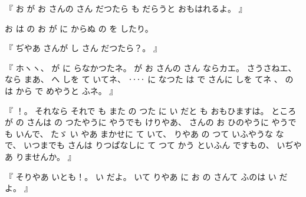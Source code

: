 %
『
お
が
お
さんの
さん
だつたら
も
だらうと
おもはれるよ。
』

%
お
は
の
お
が
に
からぬ
の
を
したり。

%
『
ぢやあ
さんが
し
さん
だつたら？。
』

%
『
ホヽヽ、
%
が
に
らなかつたネ。
%
が
お
さんの
さん%
ならカエ。
%
さうさねエ、
%
なら
まあ、
%
へ
しを
て
いてネ、
%
‥‥
に
なつた
は
で
さんに
しを
てネ
、
%
%
の
は
から
で
めやうと
ふネ。
』

%
『
！。
%
それなら
それで
も
また
の
つた
に
い
だと
も
おもひますは。
%
ところが
の
さんは
の
つたやうに
やうでも
けりやあ、
%
さんの
お
ひのやうに
やうでも
いんで、
%
たゞ
い
やあ
まかせに
て
いて、
%
りやあ
の%
つて
いふやうな
な
で、
%
いつまでも
さんは
りつぱなしに
て
つて
かう
といふん
ですもの、
%
いぢやあ
りませんか。
』

%
『
そりやあ
いとも！。
%
い
だよ。
%
いて
りやあ
に
お
の
さんて
ふのは
い
だよ。
』

